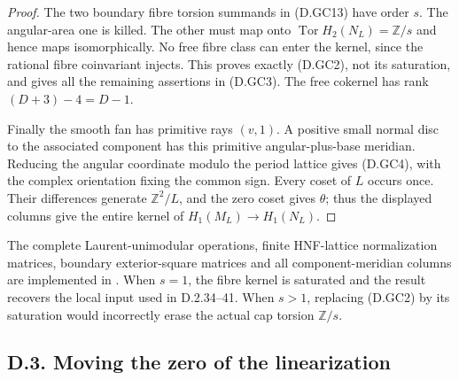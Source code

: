 \begin{proof}
The two boundary fibre torsion summands in
(D.GC13) have order $s$. The angular-area
one is killed. The other must map onto
$\operatorname{Tor}H_2(N_L)=\mathbb Z/s$ and
hence maps isomorphically. No free fibre
class can enter the kernel, since the rational
fibre coinvariant injects. This proves exactly
(D.GC2), not its saturation, and gives all
the remaining assertions in (D.GC3).
The free cokernel has rank $(D+3)-4=D-1$.

Finally the smooth fan has primitive rays
$(v,1)$. A positive small normal disc to
the associated component has this primitive
angular-plus-base meridian. Reducing the
angular coordinate modulo the period lattice
gives (D.GC4), with the complex orientation
fixing the common sign. Every coset of $L$
occurs once. Their differences generate
$\mathbb Z^2/L$, and the zero coset gives
$\theta$; thus the displayed columns give
the entire kernel of $H_1(M_L)\to H_1(N_L)$.
\end{proof}

The complete Laurent-unimodular operations,
finite HNF-lattice normalization matrices,
boundary exterior-square matrices and all
component-meridian columns are implemented in
.
When $s=1$, the fibre kernel is saturated
and the result recovers the local input used
in D.2.34--41. When $s>1$, replacing (D.GC2)
by its saturation would incorrectly erase
the actual cap torsion $\mathbb Z/s$.





















\subsection{D.3. Moving the zero of the linearization}
